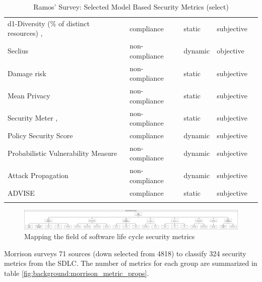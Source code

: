 \begin{tiny}
\begin{longtable}{@{}lllll@{}}
d1-Diversity (\% of distinct resources) \cite{Zhang_Wang_Jajodia_Singhal_Albanese_2016}, \cite{Wang_Zhang_Jajodia_Singhal_Albanese_2014} & compliance & static & subjective &  \\
Seclius \cite{Zonouz_Berthier_Khurana_Sanders_Yardley_2015} & non-compliance & dynamic & objective &  \\
Damage risk \cite{Chatzipoulidis_Michalopoulos_Mavridis_2015} & non-compliance & static & subjective &  \\
Mean Privacy \cite{Almasizadeh_Azgomi_2013a} & non-compliance & static & subjective &  \\
Security Meter \cite{Sahinoglu_2005}, \cite{Sahinoglu_2008} & non-compliance & static & subjective &  \\
Policy Security Score \cite{Abedin_Nessa_Al-Shaer_Khan_2006} & compliance & dynamic & subjective &  \\
Probabilistic Vulnerability Measure \cite{Ahmed_Al-Shaer_Khan_2008} & non-compliance & dynamic & subjective &  \\
Attack Propagation \cite{Ahmed_Al-Shaer_Taibah_Khan_2011} & non-compliance & dynamic & subjective &  \\
ADVISE \cite{LeMay_Ford_Keefe_Sanders_Muehrcke_2011} & compliance & static & subjective &  \\* \bottomrule
\caption{Ramos' Survey: Selected Model Based Security Metrics\cite{Ramos_Lazar_Filho_Rodrigues_2017} (select)}
\label{tab:ramos_metrics}\\
\end{longtable}
\end{tiny}


\begin{figure}[ht]
\centering
\includegraphics[width=.95\linewidth]{resource/img/ch_background/cybok_metrics/morrison_taxonomy.png}
\caption{Mapping the field of software life cycle security metrics\cite{Morrison_Moye_Pandita_Williams_2018}
\label{fig:background:morrison_taxonomy}}
\end{figure} 

Morrison surveys 71 sources (down selected from 4818) to classify 324 security metrics from the SDLC. The number of metrics for each group are summarized in table \ref{fig:background:morrison_metric_props}.

